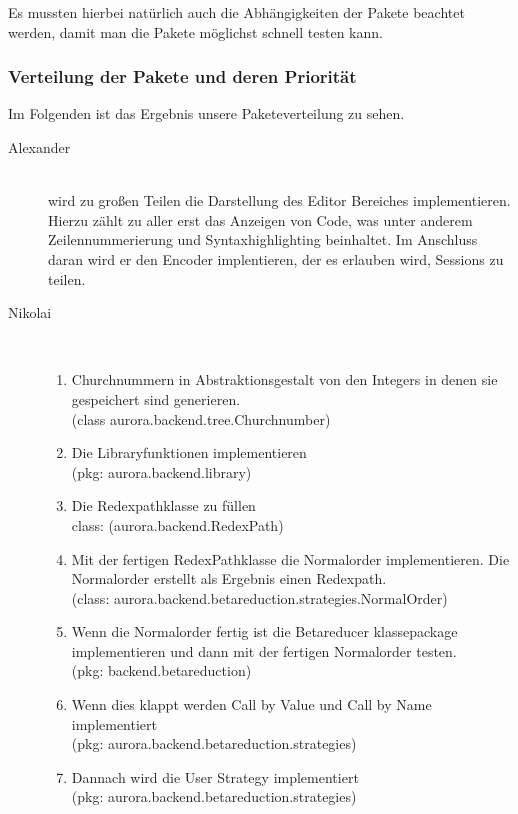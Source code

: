 \documentclass[parskip=full,11pt,twoside]{scrartcl}
\begin{document}
Es mussten hierbei natürlich auch die Abhängigkeiten der Pakete beachtet werden, damit man die Pakete möglichst schnell testen kann.


\subsubsection{Verteilung der Pakete und deren Priorität}
Im Folgenden ist das Ergebnis unsere Paketeverteilung zu sehen.
\begin{description}


    \item [Alexander]\hfill \\
      wird zu großen Teilen die Darstellung des Editor Bereiches implementieren.
        Hierzu zählt zu aller erst das Anzeigen von Code, was unter anderem Zeilennummerierung und Syntaxhighlighting beinhaltet.
        Im Anschluss daran wird er den Encoder implentieren, der es erlauben wird, Sessions zu teilen.
    \item [Nikolai]\hfill \\
    \begin{enumerate}
    \item Churchnummern in Abstraktionsgestalt von den Integers in denen sie gespeichert sind generieren. \\(class aurora.backend.tree.Churchnumber)
    \item  Die Libraryfunktionen implementieren \\(pkg: aurora.backend.library)
    \item Die Redexpathklasse zu füllen \\class: (aurora.backend.RedexPath)
    \item Mit der fertigen RedexPathklasse die Normalorder implementieren. Die Normalorder erstellt als Ergebnis einen Redexpath. \\(class: aurora.backend.betareduction.strategies.NormalOrder)
    \item Wenn die Normalorder fertig ist die Betareducer klassepackage implementieren und dann mit der fertigen Normalorder testen. 
    \\ (pkg: backend.betareduction)
    \item Wenn dies klappt werden Call by Value und Call by Name implementiert  \\(pkg: aurora.backend.betareduction.strategies)
\item Dannach wird die User Strategy implementiert \\(pkg: aurora.backend.betareduction.strategies)


\end{enumerate}
\end{description}
\end{document}
